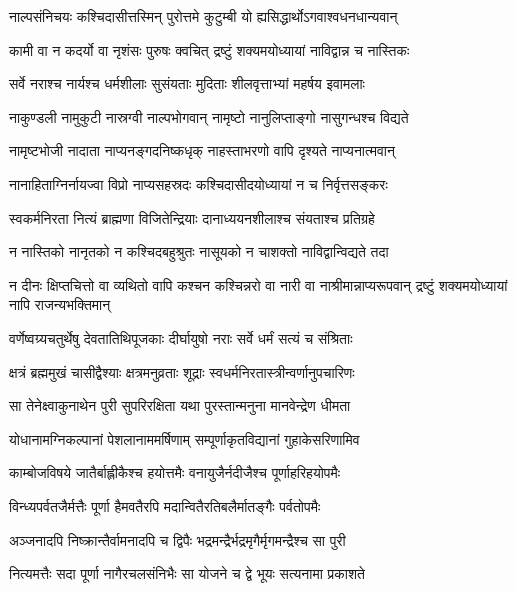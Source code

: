 \twolineshloka
{नाल्पसंनिचयः कश्चिदासीत्तस्मिन् पुरोत्तमे}
{कुटुम्बी यो ह्यसिद्धार्थोऽगवाश्वधनधान्यवान्} %

\twolineshloka
{कामी वा न कदर्यो वा नृशंसः पुरुषः क्वचित्}
{द्रष्टुं शक्यमयोध्यायां नाविद्वान्न च नास्तिकः} %

\twolineshloka
{सर्वे नराश्च नार्यश्च धर्मशीलाः सुसंयताः}
{मुदिताः शीलवृत्ताभ्यां महर्षय इवामलाः} %

\twolineshloka
{नाकुण्डली नामुकुटी नास्रग्वी नाल्पभोगवान्}
{नामृष्टो नानुलिप्ताङ्गो नासुगन्धश्च विद्यते} %

\twolineshloka
{नामृष्टभोजी नादाता नाप्यनङ्गदनिष्कधृक्}
{नाहस्ताभरणो वापि दृश्यते नाप्यनात्मवान्} %

\twolineshloka
{नानाहिताग्निर्नायज्वा विप्रो नाप्यसहस्रदः}
{कश्चिदासीदयोध्यायां न च निर्वृत्तसङ्करः} %

\twolineshloka
{स्वकर्मनिरता नित्यं ब्राह्मणा विजितेन्द्रियाः}
{दानाध्ययनशीलाश्च संयताश्च प्रतिग्रहे} %

\twolineshloka
{न नास्तिको नानृतको न कश्चिदबहुश्रुतः}
{नासूयको न चाशक्तो नाविद्वान्विद्यते तदा} %

\threelineshloka
{न दीनः क्षिप्तचित्तो वा व्यथितो वापि कश्चन}
{कश्चिन्नरो वा नारी वा नाश्रीमान्नाप्यरूपवान्}
{द्रष्टुं शक्यमयोध्यायां नापि राजन्यभक्तिमान्} %

\twolineshloka
{वर्णेष्वग्र्यचतुर्थेषु देवतातिथिपूजकाः}
{दीर्घायुषो नराः सर्वे धर्मं सत्यं च संश्रिताः} %

\twolineshloka
{क्षत्रं ब्रह्ममुखं चासीद्वैश्याः क्षत्रमनुव्रताः}
{शूद्राः स्वधर्मनिरतास्त्रीन्वर्णानुपचारिणः} %

\twolineshloka
{सा तेनेक्ष्वाकुनाथेन पुरी सुपरिरक्षिता}
{यथा पुरस्तान्मनुना मानवेन्द्रेण धीमता} %

\twolineshloka
{योधानामग्निकल्पानां पेशलानाममर्षिणाम्}
{सम्पूर्णाकृतविद्यानां गुहाकेसरिणामिव} %

\twolineshloka
{काम्बोजविषये जातैर्बाह्लीकैश्च हयोत्तमैः}
{वनायुजैर्नदीजैश्च पूर्णाहरिहयोपमैः} %

\twolineshloka
{विन्ध्यपर्वतजैर्मत्तैः पूर्णा हैमवतैरपि}
{मदान्वितैरतिबलैर्मातङ्गैः पर्वतोपमैः} %

\twolineshloka
{अञ्जनादपि निष्क्रान्तैर्वामनादपि च द्विपैः}
{भद्रमन्द्रैर्भद्रमृगैर्मृगमन्द्रैश्च सा पुरी} %

\twolineshloka
{नित्यमत्तैः सदा पूर्णा नागैरचलसंनिभैः}
{सा योजने च द्वे भूयः सत्यनामा प्रकाशते} %

